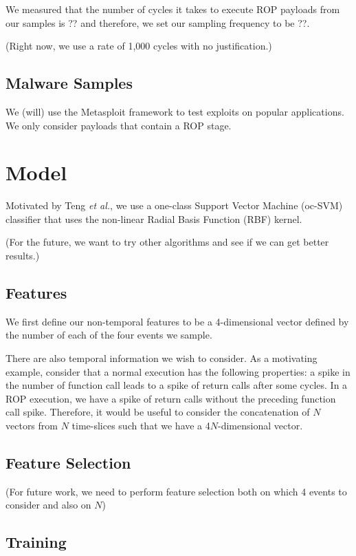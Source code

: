 \documentclass[letterpaper,twocolumn,10pt]{article}
\begin{document}
We measured that the number of cycles it takes to execute ROP payloads from our samples 
is ?? and therefore, we set our sampling frequency to be ??.

(Right now, we use a rate of 1,000 cycles with no justification.)

\subsection*{Malware Samples}

We (will) use the Metasploit framework to test exploits on popular applications. We only 
consider payloads that contain a ROP stage.

\section{Model}

Motivated by Teng \textit{et al.}, we use a one-class Support Vector Machine (oc-SVM) 
classifier that uses the non-linear Radial Basis Function (RBF) kernel\cite{DBLP:journals/corr/TangSS14}.

(For the future, we want to try other algorithms and see if we can get better results.) 

\subsection*{Features}

We first define our non-temporal features to be a 4-dimensional vector defined 
by the number of each of the four events we sample.

There are also temporal information we wish to consider. As a motivating example, 
consider that a normal execution has the following properties: a spike in the number 
of function call leads to a spike of return calls after some cycles. In a ROP execution, 
we have a spike of return calls without the preceding function call spike. Therefore, 
it would be useful to consider the concatenation of $N$ vectors from $N$ time-slices 
such that we have a 4$N$-dimensional vector.

\subsection*{Feature Selection}

(For future work, we need to perform feature selection both on which 4 events 
to consider and also on $N$)

\subsection*{Training}
\end{document}
